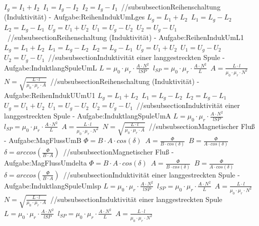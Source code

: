 $ I_{g}  = I_{1}  + I_{2} $\ 
$ I_{1}  = I_{g}  - I_{2} $\ 
$ I_{2}  = I_{g}  - I_{1} $\ 
//subsubsection{Reihenschaltung (Induktivität) - Aufgabe:ReihenIndukUmLges} 
$ L_{g}  = L_{1}  + L_{2} $\ 
$ L_{1}  = L_{g}  - L_{2} $\ 
$ L_{2}  = L_{g}  - L_{1} $\ 
$ U_{g}  = U_{1}  + U_{2} $\ 
$ U_{1}  = U_{g}  - U_{2} $\ 
$ U_{2}  = U_{g}  - U_{1} $\ 
//subsubsection{Reihenschaltung (Induktivität) - Aufgabe:ReihenIndukUmL1} 
$ L_{g}  = L_{1}  + L_{2} $\ 
$ L_{1}  = L_{g}  - L_{2} $\ 
$ L_{2}  = L_{g}  - L_{1} $\ 
$ U_{g}  = U_{1}  + U_{2} $\ 
$ U_{1}  = U_{g}  - U_{2} $\ 
$ U_{2}  = U_{g}  - U_{1} $\ 
//subsubsection{Induktivität einer langgestreckten Spule - Aufgabe:InduktlangSpuleUmL} 
$ L = \mu _{0} \cdot \mu _{r} \cdot \frac{A\cdot N^{2} }{lSP} $\ 
$ l_{SP} = \mu _{0} \cdot \mu _{r} \cdot \frac{A\cdot N^{2} }{L} $\ 
$ A = \frac{ L\cdot l}{\mu _{0} \cdot \mu _{r} \cdot N^{2} } $\ 
$ N = \sqrt{\frac{ L\cdot l}{\mu _{0} \cdot \mu _{r} \cdot A}} $\ 
//subsubsection{Reihenschaltung (Induktivität) - Aufgabe:ReihenIndukUUmU1} 
$ L_{g}  = L_{1}  + L_{2} $\ 
$ L_{1}  = L_{g}  - L_{2} $\ 
$ L_{2}  = L_{g}  - L_{1} $\ 
$ U_{g}  = U_{1}  + U_{2} $\ 
$ U_{1}  = U_{g}  - U_{2} $\ 
$ U_{2}  = U_{g}  - U_{1} $\ 
//subsubsection{Induktivität einer langgestreckten Spule - Aufgabe:InduktlangSpuleUmA} 
$ L = \mu _{0} \cdot \mu _{r} \cdot \frac{A\cdot N^{2} }{lSP} $\ 
$ l_{SP} = \mu _{0} \cdot \mu _{r} \cdot \frac{A\cdot N^{2} }{L} $\ 
$ A = \frac{ L\cdot l}{\mu _{0} \cdot \mu _{r} \cdot N^{2} } $\ 
$ N = \sqrt{\frac{ L\cdot l}{\mu _{0} \cdot \mu _{r} \cdot A}} $\ 
//subsubsection{Magnetischer Fluß - Aufgabe:MagFlussUmB} 
$ \Phi  = B\cdot A\cdot cos(\delta ) $\ 
$ A = \frac{ \Phi }{B\cdot cos(\delta )} $\ 
$ B = \frac{ \Phi }{A\cdot cos(\delta )} $\ 
$ \delta =arccos(\frac{ \Phi }{B\cdot A}) $\ 
//subsubsection{Magnetischer Fluß - Aufgabe:MagFlussUmdelta} 
$ \Phi  = B\cdot A\cdot cos(\delta ) $\ 
$ A = \frac{ \Phi }{B\cdot cos(\delta )} $\ 
$ B = \frac{ \Phi }{A\cdot cos(\delta )} $\ 
$ \delta =arccos(\frac{ \Phi }{B\cdot A}) $\ 
//subsubsection{Induktivität einer langgestreckten Spule - Aufgabe:InduktlangSpuleUmlsp} 
$ L = \mu _{0} \cdot \mu _{r} \cdot \frac{A\cdot N^{2} }{lSP} $\ 
$ l_{SP} = \mu _{0} \cdot \mu _{r} \cdot \frac{A\cdot N^{2} }{L} $\ 
$ A = \frac{ L\cdot l}{\mu _{0} \cdot \mu _{r} \cdot N^{2} } $\ 
$ N = \sqrt{\frac{ L\cdot l}{\mu _{0} \cdot \mu _{r} \cdot A}} $\ 
//subsubsection{Induktivität einer langgestreckten Spule} 
$ L = \mu _{0} \cdot \mu _{r} \cdot \frac{A\cdot N^{2} }{lSP} $\ 
$ l_{SP} = \mu _{0} \cdot \mu _{r} \cdot \frac{A\cdot N^{2} }{L} $\ 
$ A = \frac{ L\cdot l}{\mu _{0} \cdot \mu _{r} \cdot N^{2} } $\ 
